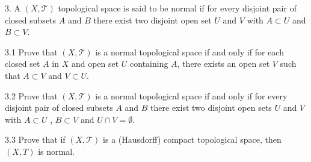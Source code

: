 \documentclass[11pt]{amsart}
\begin{document}
\newpage
\begin{tcolorbox}
3. A $(X,\mathcal{T})$ topological space is said to be normal if for every disjoint pair of closed subsets $A$ and $B$
there exist two disjoint open set $U$ and $V$ with $A \subset U$ and $B\subset V$.

3.1 Prove that $(X,\mathcal{T})$ is a normal topological space if and only if for each closed set $A$ in $X$ and open
set $U$ containing $A$, there exists an open set $V$ such that $A\subset V$ and $V \subset U$.

3.2 Prove that $(X,\mathcal{T})$ is a normal topological space if and only if for every disjoint pair of closed subsets $A$ and $B$ there exist two disjoint open sets $U$ and $V$ with $A \subset U$ , $B \subset V$ and $U \cap V = \emptyset$.

3.3 Prove that if $(X,\mathcal{T})$ is a (Hausdorff) compact topological space, then $(X, T )$ is normal.
\end{tcolorbox}
\end{document}
